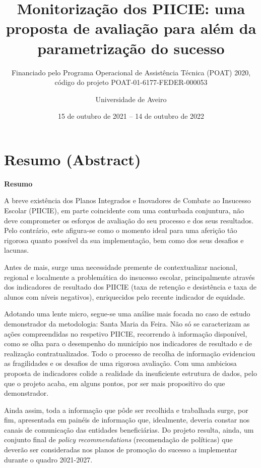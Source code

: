 \documentclass[
]{book}
\title{Monitorização dos PIICIE: uma proposta de avaliação para além da parametrização do sucesso}
\subtitle{Financiado pelo Programa Operacional de Assistência Técnica (POAT) 2020, código do projeto POAT-01-6177-FEDER-000053}
\author{Universidade de Aveiro}
\date{15 de outubro de 2021 -- 14 de outubro de 2022}
\begin{document}
\maketitle

{
\setcounter{tocdepth}{1}
\tableofcontents
}
\hypertarget{resumo-abstract}{%
\chapter*{\texorpdfstring{\textbf{Resumo (Abstract)}}{Resumo (Abstract)}}\label{resumo-abstract}}

\textbf{Resumo}

A breve existência dos Planos Integrados e Inovadores de Combate ao Insucesso Escolar (PIICIE), em parte coincidente com uma conturbada conjuntura, não deve comprometer os esforços de avaliação do seu processo e dos seus resultados. Pelo contrário, este afigura-se como o momento ideal para uma aferição tão rigorosa quanto possível da sua implementação, bem como dos seus desafios e lacunas.

Antes de mais, surge uma necessidade premente de contextualizar nacional, regional e localmente a problemática do insucesso escolar, principalmente através dos indicadores de resultado dos PIICIE (taxa de retenção e desistência e taxa de alunos com níveis negativos), enriquecidos pelo recente indicador de equidade.

Adotando uma lente micro, segue-se uma análise mais focada no caso de estudo demonstrador da metodologia: Santa Maria da Feira. Não só se caracterizam as ações compreendidas no respetivo PIICIE, recorrendo à informação disponível, como se olha para o desempenho do município nos indicadores de resultado e de realização contratualizados. Todo o processo de recolha de informação evidenciou as fragilidades e os desafios de uma rigorosa avaliação. Com uma ambiciosa proposta de indicadores colide a realidade da insuficiente estrutura de dados, pelo que o projeto acaba, em alguns pontos, por ser mais propositivo do que demonstrador.

Ainda assim, toda a informação que pôde ser recolhida e trabalhada surge, por fim, apresentada em painéis de informação que, idealmente, deveria constar nos canais de comunicação das entidades beneficiárias. Do projeto resulta, ainda, um conjunto final de \emph{policy recommendations} (recomendação de políticas) que deverão ser consideradas nos planos de promoção do sucesso a implementar durante o quadro 2021-2027.
\end{document}

